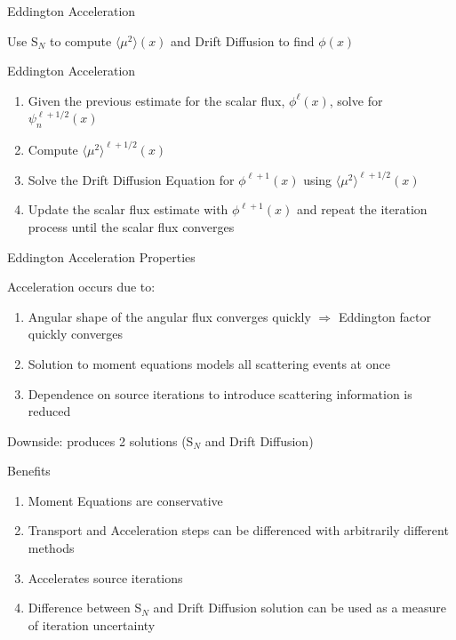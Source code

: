 \documentclass[10pt]{beamer}
\newcommand{\SN}{S$_N$\xspace}
\newcommand{\edd}{\langle \mu^2 \rangle}
\begin{document}
\begin{frame}{Eddington Acceleration}

    Use \SN to compute $\edd(x)$ and Drift Diffusion to find $\phi(x)$ 

    \begin{exampleblock}{Eddington Acceleration}
    \begin{enumerate}
        \item Given the previous estimate for the scalar flux, $\phi^{\ell}(x)$, solve for $\psi_n^{\ell+1/2}(x)$

        \item \alert{Compute $\edd^{\ell+1/2}(x)$ }

        \item \alert{Solve the Drift Diffusion Equation for $\phi^{\ell+1}(x)$ using $\edd^{\ell+1/2}(x)$} 

        \item Update the scalar flux estimate with $\phi^{\ell+1}(x)$ and repeat the iteration process until the scalar flux converges
    \end{enumerate}
    \end{exampleblock}

\end{frame}

\begin{frame}{Eddington Acceleration Properties}
    
    Acceleration occurs due to: 
    \begin{enumerate}
    	\item Angular shape of the angular flux converges quickly $\Rightarrow$ Eddington factor quickly converges 

    	\item Solution to moment equations models all scattering events at once 

    	\item Dependence on source iterations to introduce scattering information is reduced

    \end{enumerate}

    Downside: produces 2 solutions (\SN and Drift Diffusion)

    Benefits 
    \begin{enumerate}
        \item Moment Equations are conservative 

        \item Transport and Acceleration steps can be differenced with arbitrarily different methods 

        \item Accelerates source iterations 

        \item Difference between \SN and Drift Diffusion solution can be used as a measure of iteration uncertainty 

    \end{enumerate}

\end{frame}
\end{document}
